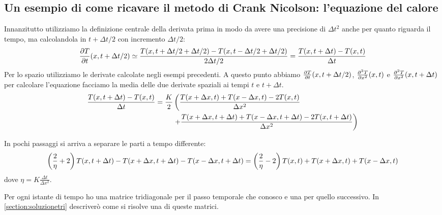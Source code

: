 \subsection{Un esempio di come ricavare il metodo di Crank Nicolson: l'equazione del calore}
Innanzitutto utilizziamo la definizione centrale della derivata prima in modo da avere una precisione di $\Delta t^2$ anche per quanto riguarda il tempo, ma  calcolandola in $t+\Delta t/2$ con incremento $\Delta t/2$:
\begin{equation}
  \pde{T}t(x,t+\Delta t/2) \simeq \frac{T(x,t+\Delta t/2+\Delta t/2)-T(x,t-\Delta t/2+\Delta t/2)}{2 \Delta t/2} = \frac{T(x,t+\Delta t)-T(x,t)}{\Delta t}
\end{equation}
Per lo spazio utilizziamo le derivate calcolate negli esempi precedenti.
A questo punto abbiamo $\pde{T}t(x,t+\Delta t/2)$, $\pde{^2T}{x^2}(x,t)$ e $\pde{^2T}{x^2}(x,t+\Delta t)$ per calcolare l'equazione facciamo la media delle due derivate spaziali ai tempi $t$ e $t+\Delta t$.
\begin{equation}\label{eq:HeatForCrank}
  \begin{aligned}
    \frac{T(x,t+\Delta t)-T(x,t)}{\Delta t} = \frac K2 &\lr(.{\frac{T(x+\Delta x,t)+T(x-\Delta x,t)-2T(x,t)}{\Delta x^2}}\\
    &\lr.){+\frac{T(x+\Delta x,t+\Delta t)+T(x-\Delta x,t+\Delta t)-2T(x,t+\Delta t)}{\Delta x^2}}
  \end{aligned}
\end{equation}

In pochi passaggi si arriva a separare le parti a tempo differente:
\begin{equation}
  \lrt{\frac 2\eta +2}T(x,t+\Delta t) -T(x+\Delta x,t+\Delta t)-T(x-\Delta x,t+\Delta t) = \lrt{\frac 2\eta -2}T(x,t)+T(x+\Delta x,t)+T(x-\Delta x,t)
\end{equation}
 dove $\eta = K\frac{\Delta t}{\Delta x^2}$.

Per ogni istante di tempo ho una matrice tridiagonale per il passo temporale che conosco e una per quello successivo. In \autoref{section:soluzionetri} descriver\`o come si risolve una di queste matrici.
